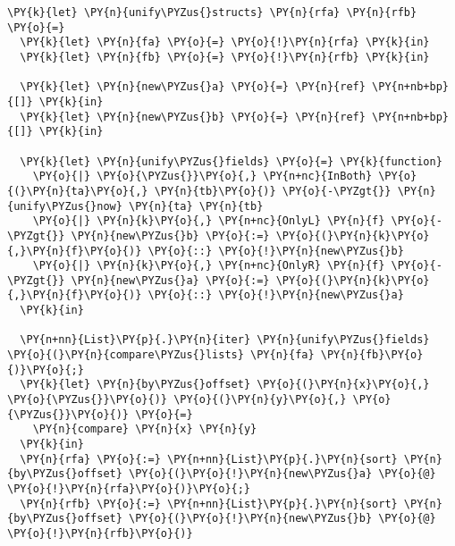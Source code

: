 \begin{Verbatim}[commandchars=\\\{\}]
\PY{k}{let} \PY{n}{unify\PYZus{}structs} \PY{n}{rfa} \PY{n}{rfb} \PY{o}{=}
  \PY{k}{let} \PY{n}{fa} \PY{o}{=} \PY{o}{!}\PY{n}{rfa} \PY{k}{in}
  \PY{k}{let} \PY{n}{fb} \PY{o}{=} \PY{o}{!}\PY{n}{rfb} \PY{k}{in}

  \PY{k}{let} \PY{n}{new\PYZus{}a} \PY{o}{=} \PY{n}{ref} \PY{n+nb+bp}{[]} \PY{k}{in}
  \PY{k}{let} \PY{n}{new\PYZus{}b} \PY{o}{=} \PY{n}{ref} \PY{n+nb+bp}{[]} \PY{k}{in}

  \PY{k}{let} \PY{n}{unify\PYZus{}fields} \PY{o}{=} \PY{k}{function}
    \PY{o}{|} \PY{o}{\PYZus{}}\PY{o}{,} \PY{n+nc}{InBoth} \PY{o}{(}\PY{n}{ta}\PY{o}{,} \PY{n}{tb}\PY{o}{)} \PY{o}{-\PYZgt{}} \PY{n}{unify\PYZus{}now} \PY{n}{ta} \PY{n}{tb}
    \PY{o}{|} \PY{n}{k}\PY{o}{,} \PY{n+nc}{OnlyL} \PY{n}{f} \PY{o}{-\PYZgt{}} \PY{n}{new\PYZus{}b} \PY{o}{:=} \PY{o}{(}\PY{n}{k}\PY{o}{,}\PY{n}{f}\PY{o}{)} \PY{o}{::} \PY{o}{!}\PY{n}{new\PYZus{}b}
    \PY{o}{|} \PY{n}{k}\PY{o}{,} \PY{n+nc}{OnlyR} \PY{n}{f} \PY{o}{-\PYZgt{}} \PY{n}{new\PYZus{}a} \PY{o}{:=} \PY{o}{(}\PY{n}{k}\PY{o}{,}\PY{n}{f}\PY{o}{)} \PY{o}{::} \PY{o}{!}\PY{n}{new\PYZus{}a}
  \PY{k}{in}

  \PY{n+nn}{List}\PY{p}{.}\PY{n}{iter} \PY{n}{unify\PYZus{}fields} \PY{o}{(}\PY{n}{compare\PYZus{}lists} \PY{n}{fa} \PY{n}{fb}\PY{o}{)}\PY{o}{;}
  \PY{k}{let} \PY{n}{by\PYZus{}offset} \PY{o}{(}\PY{n}{x}\PY{o}{,} \PY{o}{\PYZus{}}\PY{o}{)} \PY{o}{(}\PY{n}{y}\PY{o}{,} \PY{o}{\PYZus{}}\PY{o}{)} \PY{o}{=}
    \PY{n}{compare} \PY{n}{x} \PY{n}{y}
  \PY{k}{in}
  \PY{n}{rfa} \PY{o}{:=} \PY{n+nn}{List}\PY{p}{.}\PY{n}{sort} \PY{n}{by\PYZus{}offset} \PY{o}{(}\PY{o}{!}\PY{n}{new\PYZus{}a} \PY{o}{@} \PY{o}{!}\PY{n}{rfa}\PY{o}{)}\PY{o}{;}
  \PY{n}{rfb} \PY{o}{:=} \PY{n+nn}{List}\PY{p}{.}\PY{n}{sort} \PY{n}{by\PYZus{}offset} \PY{o}{(}\PY{o}{!}\PY{n}{new\PYZus{}b} \PY{o}{@} \PY{o}{!}\PY{n}{rfb}\PY{o}{)}
\end{Verbatim}
